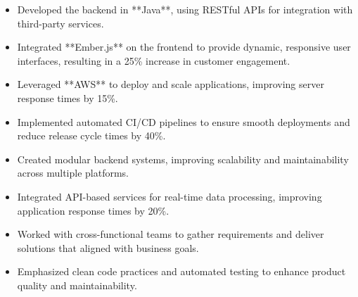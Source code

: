 \par\smallskip
\noindent
\begin{minipage}{20cm}
  \begin{minipage}{9.75cm}
    \begin{itemize}
      \item Developed the backend in **Java**, using RESTful APIs for integration with third-party services.
      \item Integrated **Ember.js** on the frontend to provide dynamic, responsive user interfaces, resulting in a 25\% increase in customer engagement.
    \end{itemize}
  \end{minipage}
  \hfill
  \begin{minipage}{9.75cm}
    \begin{itemize}
      \item Leveraged **AWS** to deploy and scale applications, improving server response times by 15\%.
      \item Implemented automated CI/CD pipelines to ensure smooth deployments and reduce release cycle times by 40\%.
    \end{itemize}
  \end{minipage}
\end{minipage}
\par\smallskip
\divider

\par\smallskip
\noindent
\begin{minipage}{20cm}
  \begin{minipage}{9.75cm}
    \begin{itemize}
      \item Created modular backend systems, improving scalability and maintainability across multiple platforms.
      \item Integrated API-based services for real-time data processing, improving application response times by 20\%.
    \end{itemize}
  \end{minipage}
  \hfill
  \begin{minipage}{9.75cm}
    \begin{itemize}
      \item Worked with cross-functional teams to gather requirements and deliver solutions that aligned with business goals.
      \item Emphasized clean code practices and automated testing to enhance product quality and maintainability.
    \end{itemize}
  \end{minipage}
\end{minipage}

